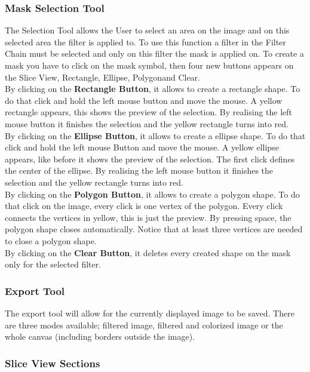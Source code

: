 \subsubsection{Mask Selection Tool}
\label{sec:mask}
The Selection Tool allows the User to select an area on the image and on this selected area the filter is applied to. To use this function a filter in the Filter Chain must be selected and only on this filter the mask is applied on. To create a mask you have to click on the mask symbol, then four new buttons appears on the Slice View, \grqq Rectangle\grqq, \grqq Ellipse\grqq, \grqq Polygon\grqq and \grqq Clear\grqq.
\\[12pt]
By clicking on the \textbf{Rectangle Button}, it allows to create a rectangle shape. To do that click and hold the left mouse button and move the mouse. A yellow rectangle appears, this shows the preview of the selection. By realising the left mouse button it finishes the selection and the yellow rectangle turns into red.
\\[12pt]
By clicking on the \textbf{Ellipse Button}, it allows to create a ellipse shape. To do that click and hold the left mouse Button and move the mouse. A yellow ellipse appears, like before it shows the preview of the selection. The first click defines the center of the ellipse. By realising the left mouse button it finishes the selection and the yellow rectangle turns into red.
\\[12pt]
By clicking on the \textbf{Polygon Button}, it allows to create a polygon shape. To do that click on the image, every click is one vertex of the polygon. Every click connects the vertices in yellow, this is just the preview. By pressing space, the polygon shape closes automatically. Notice that at least three vertices are needed to close a polygon shape.
\\[12pt]
By clicking on the \textbf{Clear Button}, it deletes every created shape on the mask only for the selected filter.

\subsubsection{Export Tool}

The export tool will allow for the currently displayed image to be saved. There are three modes available; filtered image, filtered and colorized image or the whole canvas (including borders outside the image).

\subsubsection{Slice View Sections}

